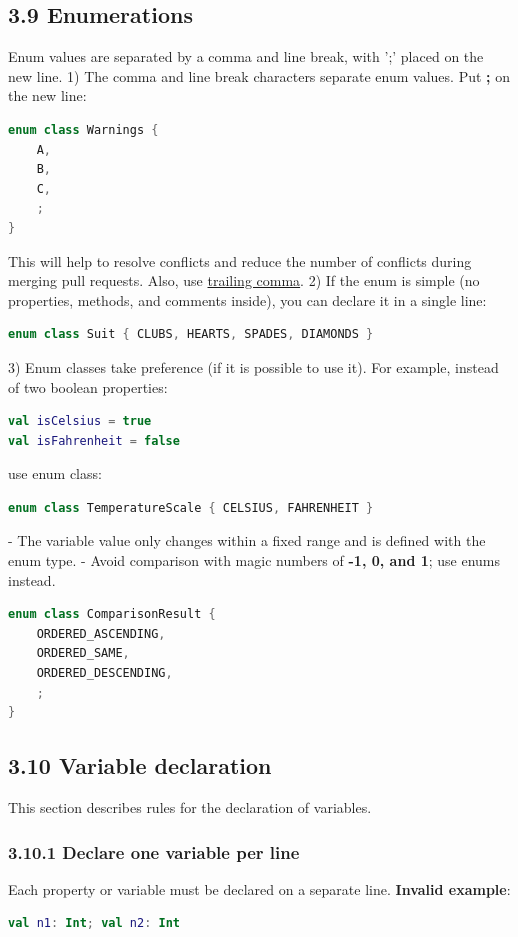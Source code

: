\subsection*{\textbf{3.9 Enumerations}}
\label{sec:3.9}
Enum values are separated by a comma and line break, with ';' placed on the new line.
1) The comma and line break characters separate enum values. Put \textbf{;} on the new line:
\begin{lstlisting}[language=Kotlin]
enum class Warnings {
    A,
    B,
    C,
    ;
}
\end{lstlisting}
This will help to resolve conflicts and reduce the number of conflicts during merging pull requests.
Also, use \href{https://kotlinlang.org/docs/reference/whatsnew14.html#trailing-comma}{trailing comma}.
2) If the enum is simple (no properties, methods, and comments inside), you can declare it in a single line:
\begin{lstlisting}[language=Kotlin]
enum class Suit { CLUBS, HEARTS, SPADES, DIAMONDS }
\end{lstlisting}
3) Enum classes take preference (if it is possible to use it). For example, instead of two boolean properties:
\begin{lstlisting}[language=Kotlin]
val isCelsius = true
val isFahrenheit = false
\end{lstlisting}
use enum class:
\begin{lstlisting}[language=Kotlin]
enum class TemperatureScale { CELSIUS, FAHRENHEIT }
\end{lstlisting}
- The variable value only changes within a fixed range and is defined with the enum type. 
- Avoid comparison with magic numbers of \textbf{-1, 0, and 1}; use enums instead.
\begin{lstlisting}[language=Kotlin]
enum class ComparisonResult {
    ORDERED_ASCENDING,
    ORDERED_SAME,
    ORDERED_DESCENDING,
    ;
}
\end{lstlisting}
\subsection*{\textbf{3.10 Variable declaration}}
\label{sec:3.10}
This section describes rules for the declaration of variables.
\subsubsection*{\textbf{3.10.1 Declare one variable per line}}
\leavevmode\newline
\label{sec:3.10.1}
Each property or variable must be declared on a separate line. 
\textbf{Invalid example}:
\begin{lstlisting}[language=Kotlin]
val n1: Int; val n2: Int
\end{lstlisting}
